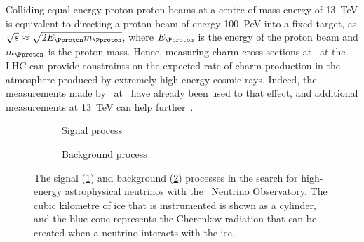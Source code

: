 Colliding equal-energy proton-proton beams at a centre-of-mass energy of 
\SI{13}{\TeV} is equivalent to directing a proton beam of energy 
\SI{100}{\peta\eV} into a fixed target, as $\sqrts \approx 
\sqrt{2E_{\Pproton}m_{\Pproton}}$, where $E_{\Pproton}$ is the energy of the 
proton beam and $m_{\Pproton}$ is the proton mass.
Hence, measuring charm cross-sections at \ at the \ac{LHC} can 
provide constraints on the expected rate of charm production in the atmosphere 
produced by extremely high-energy cosmic rays.
Indeed, the measurements made by \lhcb\ at \ have already been used 
to that effect, and additional measurements at \SI{13}{\TeV} can help 
further~\cite{Gauld:2015yia}.

\begin{figure}
  \begin{subfigure}[b]{0.5\textwidth}
    \centering
    
    \caption{Signal process}
    \label{fig:prod:theory:icecube:signal}
  \end{subfigure}
  \begin{subfigure}[b]{0.5\textwidth}
    \centering
    
    \caption{Background process}
    \label{fig:prod:theory:icecube:background}
  \end{subfigure}
  \caption{%
    The signal (\cref{fig:prod:theory:icecube:signal}) and background 
    (\cref{fig:prod:theory:icecube:background}) processes in the search for 
    high-energy astrophysical neutrinos with the \icecube\ Neutrino 
    Observatory.
    The cubic kilometre of ice that is instrumented is shown as a cylinder, and 
    the blue cone represents the Cherenkov radiation that can be created when a 
    neutrino interacts with the ice.
  }
  \label{fig:prod:theory:icecube}
\end{figure}

